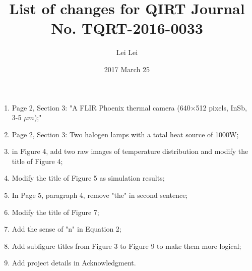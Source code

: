 \documentclass[letter]{article}
\begin{document}
    
\title{List of changes for QIRT Journal No. TQRT-2016-0033}
\author{Lei Lei}
\date{2017 March 25}

\maketitle


\begin{enumerate}
    \item Page 2, Section 3: "A FLIR Phoenix thermal camera (640×512 pixels, InSb, 3-5 $\mu m$);"
    \item Page 2, Section 3: Two halogen lamps with a total heat source of 1000W;
    \item in Figure 4, add two raw images of temperature distribution and modify the title of Figure 4;
    \item Modify the title of Figure 5 as simulation results;
    \item In Page 5, paragraph 4, remove "the" in second sentence;
    \item Modify the title of Figure 7;
    \item Add the sense of "n" in Equation 2;
    \item Add subfigure titles from Figure 3 to Figure 9 to make them more logical;
    \item Add project details in Acknowledgment.
\end{enumerate}
\end{document}
